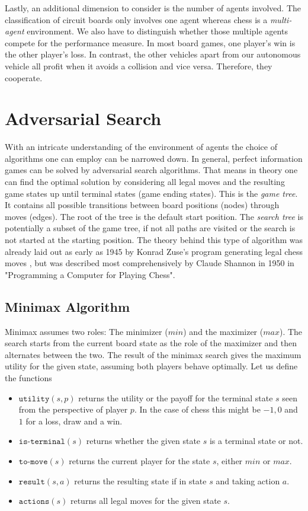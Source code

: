 Lastly, an additional dimension to consider is the number of agents involved. The classification of circuit boards only involves one agent whereas chess is a \textit{multi-agent} environment. We also have to distinguish whether those multiple agents compete for the performance measure. In most board games, one player's win is the other player's loss. In contrast, the other vehicles apart from our autonomous vehicle all profit when it avoids a collision and vice versa. Therefore, they cooperate.

\section{Adversarial Search}
With an intricate understanding of the environment of agents the choice of algorithms one can employ can be narrowed down. In general, perfect information games can be solved by adversarial search algorithms. That means in theory one can find the optimal solution by considering all legal moves and the resulting game states up until terminal states (game ending states). This is the \textit{game tree}. It contains all possible transitions between board positions (nodes) through moves (edges). The root of the tree is the default start position. The \textit{search tree} is potentially a subset of the game tree, if not all paths are visited or the search is not started at the starting position. The theory behind this type of algorithm was already laid out as early as 1945 by Konrad Zuse's program generating legal chess moves \cite{knuth_early_1980}, but was described most comprehensively by Claude Shannon in 1950 in "Programming a Computer for Playing Chess". \cite{shannon_xxii_1950}

\subsection{Minimax Algorithm}
Minimax assumes two roles: The minimizer ($min$) and the maximizer ($max$). The search starts from the current board state as the role of the maximizer and then alternates between the two. The result of the minimax search gives the maximum utility for the given state, assuming both players behave optimally. Let us define the functions \cite[p. 303f.]{russell_artificial_2021}
\begin{itemize}
    \item $\texttt{utility}(s, p)$ returns the utility or the payoff for the terminal state $s$ seen from the perspective of player $p$. In the case of chess this might be $-1, 0$ and $1$ for a loss, draw and a win.
    \item $\texttt{is-terminal}(s)$ returns whether the given state $s$ is a terminal state or not.
    \item $\texttt{to-move}(s)$ returns the current player for the state $s$, either $min$ or $max$.
    \item $\texttt{result}(s, a)$ returns the resulting state if in state $s$ and taking action $a$.
    \item $\texttt{actions}(s)$ returns all legal moves for the given state $s$.
\end{itemize}

